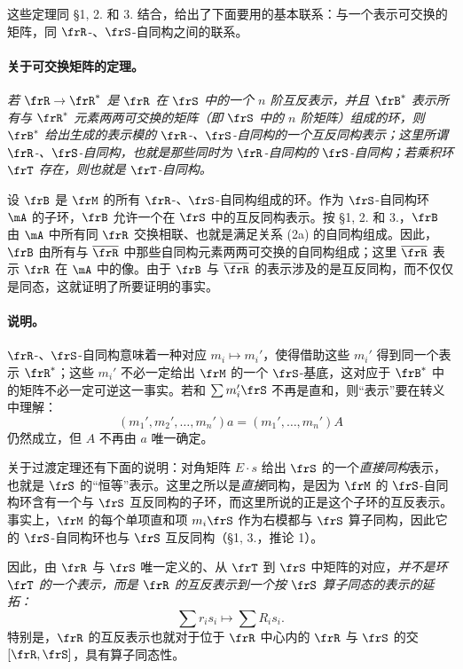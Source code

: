 这些定理同 §1, 2. 和 3. 结合，给出了下面要用的基本联系：与一个表示可交换的矩阵，同 \(\frR\)-、\(\frS\)-自同构之间的联系。

\paragraph{关于可交换矩阵的定理。}
\emph{若 \(\frR\to\frR^*\) 是 \(\frR\) 在 \(\frS\) 中的一个 \(n\) 阶互反表示，并且 \(\frB^*\) 表示所有与 \(\frR^*\) 元素两两可交换的矩阵（即 \(\frS\) 中的 \(n\) 阶矩阵）组成的环，则 \(\frB^*\) 给出生成的表示模的 \(\frR\)-、\(\frS\)-自同构的一个互反同构表示；这里所谓 \(\frR\)-、\(\frS\)-自同构，也就是那些同时为 \(\frR\)-自同构的 \(\frS\)-自同构；若乘积环 \(\frT\) 存在，则也就是 \(\frT\)-自同构。}

设 \(\frB\) 是 \(\frM\) 的所有 \(\frR\)-、\(\frS\)-自同构组成的环。作为 \(\frS\)-自同构环 \(\mA\) 的子环，\(\frB\) 允许一个在 \(\frS\) 中的互反同构表示。按 §1, 2. 和 3.，\(\frB\) 由 \(\mA\) 中所有同 \(\frR\) 交换相联、也就是满足关系 (2a) 的自同构组成。因此，\(\frB\) 由所有与 \(\overline{\frR}\) 中那些自同构元素两两可交换的自同构组成；这里 \(\overline{\frR}\) 表示 \(\frR\) 在 \(\mA\) 中的像。由于 \(\frB\) 与 \(\overline{\frR}\) 的表示涉及的是互反同构，而不仅仅是同态，这就证明了所要证明的事实。

\paragraph{说明。}
\(\frR\)-、\(\frS\)-自同构意味着一种对应 \(m_i\mapsto m_i'\)，使得借助这些 \(m_i'\) 得到同一个表示 \(\frR^*\)；这些 \(m_i'\) 不必一定给出 \(\frM\) 的一个 \(\frS\)-基底，这对应于 \(\frB^*\) 中的矩阵不必一定可逆这一事实。若和 \(\sum m_i'\frS\) 不再是直和，则“表示”要在转义中理解：
\[
        (m_1',m_2',\ldots,m_n')a=(m_1',\ldots,m_n')A
\]
仍然成立，但 \(A\) 不再由 \(a\) 唯一确定。

关于过渡定理还有下面的说明：对角矩阵 \(E\cdot s\) 给出 \(\frS\) 的一个\emph{直接同构}表示，也就是 \(\frS\) 的“恒等”表示。这里之所以是\emph{直接}同构，是因为 \(\frM\) 的 \(\frS\)-自同构环含有一个与 \(\frS\) 互反同构的子环，而这里所说的正是这个子环的互反表示。事实上，\(\frM\) 的每个单项直和项 \(m_i\frS\) 作为右模都与 \(\frS\) 算子同构，因此它的 \(\frS\)-自同构环也与 \(\frS\) 互反同构（§1, 3.，推论 1）。

因此，由 \(\frR\) 与 \(\frS\) 唯一定义的、从 \(\frT\) 到 \(\frS\) 中矩阵的对应，\emph{并不是环 \(\frT\) 的一个表示，而是 \(\frR\) 的互反表示到一个按 \(\frS\) 算子同态的表示的延拓：}
\[
        \sum r_i s_i\longmapsto \sum R_i s_i.
\]
特别是，\(\frR\) 的互反表示也就对于位于 \(\frR\) 中心内的 \(\frR\) 与 \(\frS\) 的交 \([\frR,\frS]\)，具有算子同态性。

